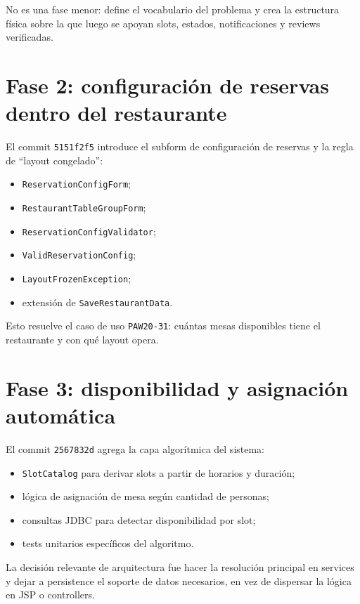 \documentclass[11pt,a4paper]{report}
\newcommand{\commit}[1]{\texttt{#1}}
\newcommand{\code}[1]{\nolinkurl{#1}}
\newcommand{\story}[1]{\texttt{#1}}
\begin{document}
No es una fase menor: define el vocabulario del problema y crea la estructura f\'isica sobre la que luego se apoyan slots, estados, notificaciones y reviews verificadas.

\section{Fase 2: configuraci\'on de reservas dentro del restaurante}

El commit \commit{5151f2f5} introduce el subform de configuraci\'on de reservas y la regla de ``layout congelado'':

\begin{itemize}
  \item \code{ReservationConfigForm};
  \item \code{RestaurantTableGroupForm};
  \item \code{ReservationConfigValidator};
  \item \code{ValidReservationConfig};
  \item \code{LayoutFrozenException};
  \item extensi\'on de \code{SaveRestaurantData}.
\end{itemize}

Esto resuelve el caso de uso \story{PAW20-31}: cu\'antas mesas disponibles tiene el restaurante y con qu\'e layout opera.

\section{Fase 3: disponibilidad y asignaci\'on autom\'atica}

El commit \commit{2567832d} agrega la capa algor\'itmica del sistema:

\begin{itemize}
  \item \code{SlotCatalog} para derivar slots a partir de horarios y duraci\'on;
  \item l\'ogica de asignaci\'on de mesa seg\'un cantidad de personas;
  \item consultas JDBC para detectar disponibilidad por slot;
  \item tests unitarios espec\'ificos del algoritmo.
\end{itemize}

La decisi\'on relevante de arquitectura fue hacer la resoluci\'on principal en services y dejar a persistence el soporte de datos necesarios, en vez de dispersar la l\'ogica en JSP o controllers.
\end{document}
